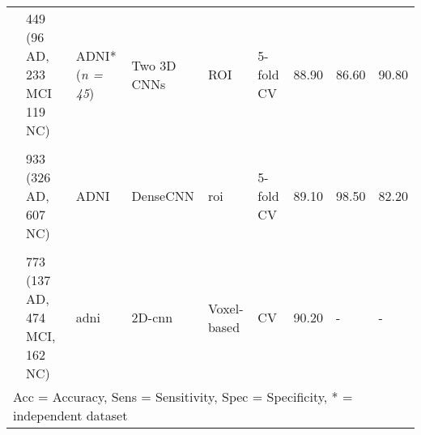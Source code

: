 \begin{table}[H]
{\begin{tabular}{lllllllll}
          \\
          
    \multicolumn{1}{l}{\cite{liuMultimodelDeepConvolutional2020a}} & 449 (96 AD, 233 MCI 119 NC) & \multicolumn{1}{l}{ADNI*(\textit{n = 45})} & Two 3D CNNs & ROI & 5-fold CV & 88.90 & 86.60 & 90.80 \\
    

          \\
          
    \multicolumn{1}{l}{\cite{wangDenseCNNDenselyConnected2021}} & 933 (326 AD, 607 NC) & \multicolumn{1}{l}{ADNI} &  DenseCNN & \gls{roi} & 5-fold CV & 89.10 & 98.50 & 82.20  \\
\\

  \multicolumn{1}{l}{\cite{nanniComparisonTransferLearning2020}} & 773 (137 AD, 474 MCI, 162 NC) & \multicolumn{1}{l}{\gls{adni}} & \multicolumn{1}{l}{2D-\gls{cnn}} & Voxel-based & CV  & 90.20    & -     & - \\
   
  
    \hline \hline
    
    \multicolumn{8}{l}{Acc = Accuracy, Sens = Sensitivity, Spec = Specificity, * = independent dataset}
    \end{tabular} }
  
\end{table}%